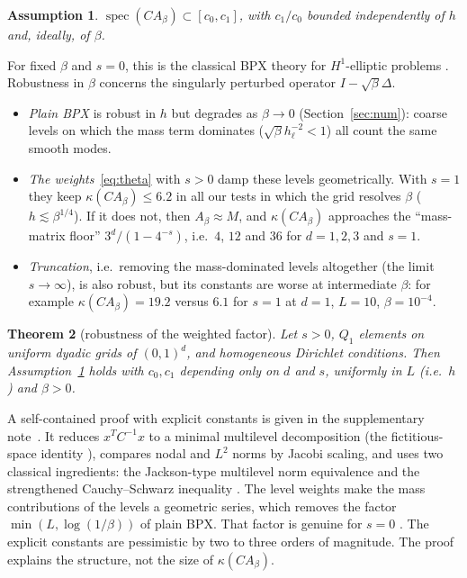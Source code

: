 \documentclass[11pt,a4paper]{article}
\newtheorem{theorem}{Theorem}[section]
\newtheorem{assumption}[theorem]{Assumption}
\theoremstyle{remark}
\begin{document}
\begin{assumption}\label{ass:bpx}
$\operatorname{spec}(CA_\beta)\subset[c_0,c_1]$, with $c_1/c_0$ bounded independently of $h$
and, ideally, of $\beta$.
\end{assumption}

For fixed $\beta$ and $s=0$, this is the classical BPX theory for
$H^1$-elliptic problems \cite{BPX90,Xu92,Oswald94}. Robustness in $\beta$
concerns the singularly perturbed operator $I-\sqrt\beta\Delta$.
\begin{itemize}
\item \emph{Plain BPX} is robust in $h$ but degrades as $\beta\to0$
  (Section~\ref{sec:num}): coarse levels on which the mass term dominates
  ($\sqrt\beta h_\ell^{-2}<1$) all count the same smooth modes.
\item \emph{The weights}~\eqref{eq:theta} with $s>0$ damp these levels
  geometrically. With $s=1$ they keep $\kappa(CA_\beta)\le6.2$ in all our tests in
  which the grid resolves $\beta$ ($h\lesssim\beta^{1/4}$). If it does not, then
  $A_\beta\approx M$, and $\kappa(CA_\beta)$ approaches the ``mass-matrix floor''
  $3^d/(1-4^{-s})$, i.e.\ $4$, $12$ and $36$ for $d=1,2,3$ and $s=1$.
\item \emph{Truncation}, i.e.\ removing the mass-dominated levels altogether
  (the limit $s\to\infty$), is also robust, but its constants are worse at
  intermediate $\beta$: for example $\kappa(CA_\beta)=19.2$ versus $6.1$ for $s=1$
  at $d=1$, $L=10$, $\beta=10^{-4}$.
\end{itemize}

\begin{theorem}[robustness of the weighted factor]\label{thm:robust}
Let $s>0$, $Q_1$ elements on uniform dyadic grids of $(0,1)^d$, and
homogeneous Dirichlet conditions. Then Assumption~\ref{ass:bpx} holds with
$c_0,c_1$ depending only on $d$ and $s$, uniformly in $L$ (i.e.\ $h$) and
$\beta>0$.
\end{theorem}
A self-contained proof with explicit constants is given in the
supplementary note~\cite{SuppProof}. It reduces $x^TC^{-1}x$ to a minimal
multilevel decomposition (the fictitious-space identity
\cite{GO95b,XZ02}), compares nodal and $L^2$ norms by Jacobi scaling, and
uses two classical ingredients: the Jackson-type multilevel norm
equivalence \cite[proof of Thm.~1]{GO95} and the strengthened
Cauchy--Schwarz inequality \cite[Lemma~6.1]{Xu92}. The level weights make
the mass contributions of the levels a geometric series, which removes
the factor $\min(L,\log(1/\beta))$ of plain BPX. That factor is genuine
for $s=0$ \cite[Rem.~4.5]{KXZ16}. The explicit constants are pessimistic by
two to three orders of magnitude. The proof explains the structure, not
the size of $\kappa(CA_\beta)$.
\end{document}
